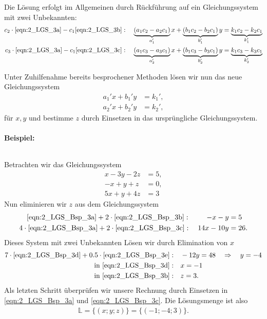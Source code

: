 Die Lösung erfolgt im Allgemeinen durch Rückführung auf ein Gleichungssystem mit zwei Unbekannten: 
\begin{align}
    c_2\cdot \eqref{eqn:2_LGS_3a} - c_1 \eqref{eqn:2_LGS_3b}: \quad \underbrace{(a_1 c_2 -a_2 c_1)}_{a_1'} x + \underbrace{(b_1 c_2 - b_2 c_1)}_{b_1'} y &= \underbrace{k_1 c_2 -k_2 c_1}_{k_1'} \\
    c_3\cdot \eqref{eqn:2_LGS_3a} - c_1 \eqref{eqn:2_LGS_3c}: \quad \underbrace{(a_1 c_3 -a_3 c_1)}_{a_2'} x + \underbrace{(b_1 c_3 - b_3 c_1)}_{b_2'} y &= \underbrace{k_1 c_3 -k_3 c_1}_{k_2'}
\end{align}

Unter Zuhilfenahme bereits besprochener Methoden lösen wir nun das neue Gleichungssystem 
\begin{subequations}
    \begin{align}
            a_1' x + b_1' y &= k_1', \\
            a_2' x + b_2' y &= k_2', 
        \end{align}
\end{subequations}
für $x,y$ und bestimme $z$ durch Einsetzen in das ursprüngliche Gleichungssystem. 

\paragraph{Beispiel:}$~$

Betrachten wir das Gleichungssystem 
\begin{subequations}
    \begin{align}
        x -3y -2z &= 5,  \label{eqn:2_LGS_Bsp_3a}\\
        -x + y + z &= 0,  \label{eqn:2_LGS_Bsp_3b}\\
        5x +y + 4z &= 3  \label{eqn:2_LGS_Bsp_3c}
    \end{align}
\end{subequations}
Nun eliminieren wir $z$ aus dem Gleichungssystem 
\begin{subequations}
    \begin{align}
        \eqref{eqn:2_LGS_Bsp_3a} + 2 \cdot \eqref{eqn:2_LGS_Bsp_3b}:  \quad\;\quad-x-y&= 5 \label{eqn:2_LGS_Bsp_3d}\\
        4\cdot\eqref{eqn:2_LGS_Bsp_3a} + 2\cdot \eqref{eqn:2_LGS_Bsp_3c}:  \quad14 x-10y&= 26. \label{eqn:2_LGS_Bsp_3e}
    \end{align}
\end{subequations}
Dieses System mit zwei Unbekannten Lösen wir durch Elimination von $x$
\begin{align}
    7 \cdot \eqref{eqn:2_LGS_Bsp_3d} + 0.5\cdot\eqref{eqn:2_LGS_Bsp_3e}:& \quad -12 y = 48 \quad \Rightarrow \quad y = -4 \notag \\
    \text{in } \eqref{eqn:2_LGS_Bsp_3d}:& \quad x=-1 \\
    \text{in } \eqref{eqn:2_LGS_Bsp_3b}:& \quad z=3.
\end{align}
Als letzten Schritt überprüfen wir unsere Rechnung durch Einsetzen in \eqref{eqn:2_LGS_Bsp_3a} und \eqref{eqn:2_LGS_Bsp_3c}. Die Lösungsmenge ist also 
\begin{align}
    \mathbb{L} = \{(x;y;z)\} = \{(\minus1;\minus4;3)\}.
\end{align}

